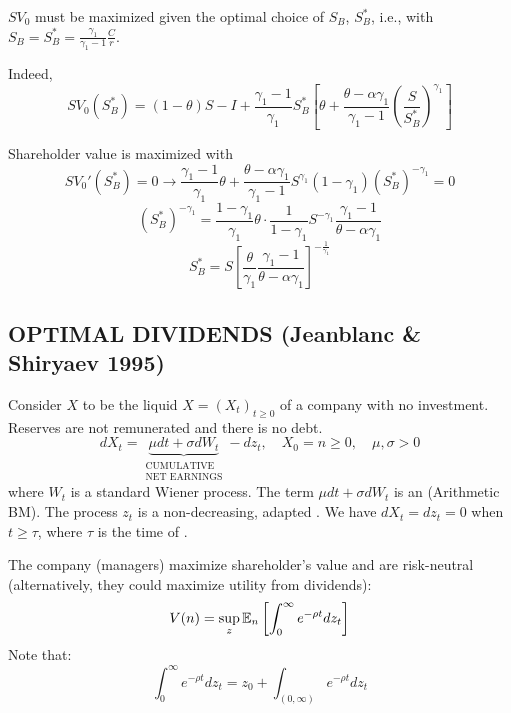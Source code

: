 $SV_0$ must be maximized given the optimal choice of $S_B$, $S_B^*$, i.e., with $S_B = S_B^* = \frac{\gamma_1}{\gamma_1-1} \frac{C}{r}$.

Indeed,
\begin{equation*}
    SV_0(S_B^*) = (1-\theta)S - I + \frac{\gamma_1-1}{\gamma_1} S_B^* \left[ \theta + \frac{\theta - \alpha \gamma_1}{\gamma_1-1} \left( \frac{S}{S_B^*} \right)^{\gamma_1} \right]
\end{equation*}

Shareholder value is maximized with
\begin{equation*}
    SV_0'(S_B^*) = 0 \rightarrow \frac{\gamma_1-1}{\gamma_1} \theta + \frac{\theta - \alpha \gamma_1}{\gamma_1-1} S^{\gamma_1} (1-\gamma_1) (S_B^*)^{-\gamma_1} = 0
\end{equation*}
\begin{equation*}
    (S_B^*)^{-\gamma_1} = \frac{1-\gamma_1}{\gamma_1} \theta \cdot \frac{1}{1-\gamma_1} S^{-\gamma_1} \frac{\gamma_1-1}{\theta - \alpha \gamma_1}
\end{equation*}
\begin{equation*}
    S_B^* = S \left[ \frac{\theta}{\gamma_1} \frac{\gamma_1-1}{\theta - \alpha \gamma_1} \right]^{-\frac{1}{\gamma_1}}
\end{equation*}

\subsection*{\color{red}OPTIMAL DIVIDENDS (Jeanblanc \& Shiryaev 1995)}

Consider $X$ to be the liquid  $X = (X_t)_{t \geq 0}$ of a company with no investment. Reserves are not remunerated and there is no debt.
\begin{equation*}
    dX_t = \underbrace{\mu dt + \sigma dW_t}_{\substack{\text{CUMULATIVE} \\ \text{NET EARNINGS}}} - dz_t, \quad X_0 = n \geq 0, \quad \mu, \sigma > 0
\end{equation*}
where $W_t$ is a standard Wiener process. The term $\mu dt + \sigma dW_t$ is an  (Arithmetic BM).
The process $z_t$ is a non-decreasing, adapted .
We have $dX_t = dz_t = 0$ when $t \geq \tau$, where $\tau$ is the time of .

The company (managers) maximize shareholder's value and are risk-neutral (alternatively, they could maximize utility from dividends):
\begin{equation*}
    V(n) = \sup_z \mathbb E_n \left[ \int_0^\infty e^{-\rho t} dz_t \right]
\end{equation*}
Note that:
\begin{equation*}
    \int_0^\infty e^{-\rho t} dz_t = z_0 + \int_{(0, \infty)} e^{-\rho t} dz_t
\end{equation*}

